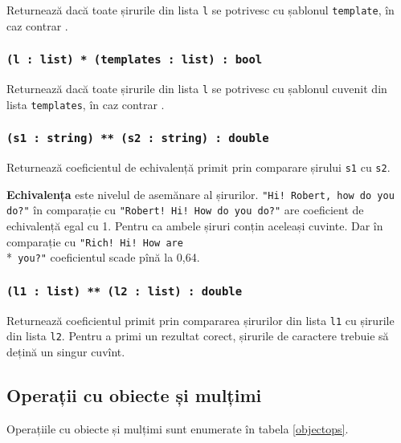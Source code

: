 Returnează \true{} dacă toate șirurile din lista \texttt{l} se potrivesc cu șablonul \texttt{template}, în caz contrar \false{}.

\subsubsection{\texttt{(l : list) * (templates : list) : bool}}

Returnează \true{} dacă toate șirurile din lista \texttt{l} se potrivesc cu șablonul cuvenit din lista \texttt{templates}, în caz contrar \false{}.

\subsubsection{\texttt{(s1 : string) ** (s2 : string) : double}}

Returnează coeficientul de echivalență primit prin comparare șirului \texttt{s1} cu \texttt{s2}.

{\bf Echivalența} este nivelul de asemănare al șirurilor. \texttt{"Hi! Robert, how do you do?"} în comparație cu \texttt{"Robert! Hi! How do you do?"} are coeficient de echivalență egal cu 1. Pentru ca ambele șiruri conțin aceleași cuvinte. Dar în comparație cu  \texttt{"Rich! Hi! How are}\\*\texttt{ you?"} coeficientul scade pînă la 0,64.

\subsubsection{\texttt{(l1 : list) ** (l2 : list) : double}}

Returnează coeficientul primit prin compararea șirurilor din lista \texttt{l1} cu șirurile din lista \texttt{l2}.
Pentru a primi un rezultat corect, șirurile de caractere trebuie să dețină un singur cuvînt.

\subsection{Operații cu obiecte și mulțimi}

Operațiile cu obiecte și mulțimi sunt enumerate în tabela \ref{objectops}.

